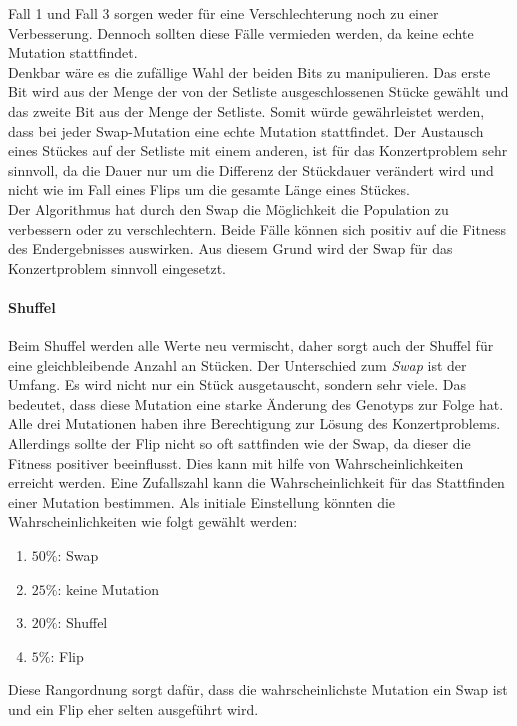 Fall 1 und Fall 3 sorgen weder für eine Verschlechterung noch zu einer Verbesserung. Dennoch sollten diese 
Fälle vermieden werden, da keine echte Mutation stattfindet. \\
Denkbar wäre es die zufällige Wahl der beiden Bits zu manipulieren. Das erste Bit wird aus der Menge der 
von der Setliste ausgeschlossenen Stücke gewählt und das zweite Bit aus der Menge der Setliste. 
Somit würde gewährleistet werden, dass bei jeder Swap-Mutation eine echte Mutation stattfindet. 
Der Austausch eines Stückes auf der Setliste mit einem anderen, ist für das Konzertproblem sehr sinnvoll, 
da die Dauer nur um die Differenz der Stückdauer verändert wird und nicht wie im Fall eines Flips um die gesamte
Länge eines Stückes. \\
Der Algorithmus hat durch den Swap die Möglichkeit die Population zu verbessern oder zu verschlechtern. 
Beide Fälle können sich positiv auf die Fitness des Endergebnisses auswirken. Aus diesem Grund 
wird der Swap für das Konzertproblem sinnvoll eingesetzt. 

\paragraph{Shuffel}
Beim Shuffel werden alle Werte neu vermischt, daher sorgt auch der Shuffel für eine gleichbleibende Anzahl an Stücken.
Der Unterschied zum \emph{Swap} ist der Umfang. Es wird nicht nur ein Stück ausgetauscht, sondern sehr viele. 
Das bedeutet, dass diese Mutation eine starke Änderung des Genotyps zur Folge hat. \\

Alle drei Mutationen haben ihre Berechtigung zur Lösung des Konzertproblems. Allerdings sollte 
der Flip nicht so oft sattfinden wie der Swap, da dieser die Fitness positiver beeinflusst. 
Dies kann mit hilfe von Wahrscheinlichkeiten erreicht werden. Eine Zufallszahl kann die Wahrscheinlichkeit 
für das Stattfinden einer Mutation bestimmen. 
Als initiale Einstellung könnten die Wahrscheinlichkeiten wie folgt gewählt werden: 
\begin{enumerate}
    \item $50\%$: Swap
    \item $25\%$: keine Mutation
    \item $20\%$: Shuffel
    \item $5\%$: Flip
\end{enumerate}
Diese Rangordnung sorgt dafür, dass die wahrscheinlichste Mutation ein Swap ist und ein Flip eher selten ausgeführt wird.
